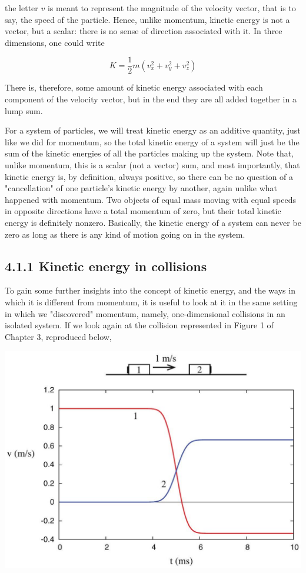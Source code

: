 \documentclass[10pt]{article}
\begin{document}
the letter $v$ is meant to represent the magnitude of the velocity vector, that is to say, the speed of the particle. Hence, unlike momentum, kinetic energy is not a vector, but a scalar: there is no sense of direction associated with it. In three dimensions, one could write


\begin{equation*}
K=\frac{1}{2} m\left(v_{x}^{2}+v_{y}^{2}+v_{z}^{2}\right) \tag{4.2}
\end{equation*}


There is, therefore, some amount of kinetic energy associated with each component of the velocity vector, but in the end they are all added together in a lump sum.

For a system of particles, we will treat kinetic energy as an additive quantity, just like we did for momentum, so the total kinetic energy of a system will just be the sum of the kinetic energies of all the particles making up the system. Note that, unlike momentum, this is a scalar (not a vector) sum, and most importantly, that kinetic energy is, by definition, always positive, so there can be no question of a "cancellation" of one particle's kinetic energy by another, again unlike what happened with momentum. Two objects of equal mass moving with equal speeds in opposite directions have a total momentum of zero, but their total kinetic energy is definitely nonzero. Basically, the kinetic energy of a system can never be zero as long as there is any kind of motion going on in the system.

\subsection*{4.1.1 Kinetic energy in collisions}
To gain some further insights into the concept of kinetic energy, and the ways in which it is different from momentum, it is useful to look at it in the same setting in which we "discovered" momentum, namely, one-dimensional collisions in an isolated system. If we look again at the collision represented in Figure 1 of Chapter 3, reproduced below,

\begin{center}
\includegraphics[max width=\textwidth]{2024_09_14_9969b06773f10b6936e8g-088}
\end{center}
\end{document}
